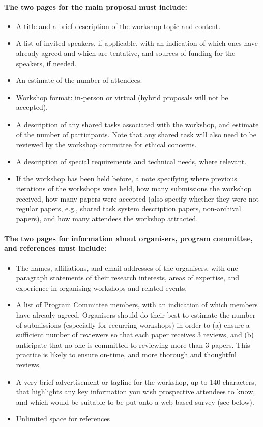 \documentclass[11pt]{article}
\begin{document}
\paragraph{The two pages for the main proposal must include:}
\begin{itemize}
    \item A title and a brief description of the workshop topic and content.
    \item A list of invited speakers, if applicable, with an indication of which ones have already agreed and which are tentative, and sources of funding for the speakers, if needed.
    \item An estimate of the number of attendees.
    \item Workshop format: in-person or virtual (hybrid proposals will not be accepted).
    \item A description of any shared tasks associated with the workshop, and estimate of the number of participants. Note that any shared task will also need to be reviewed by the workshop committee for ethical concerns.
    \item A description of special requirements and technical needs, where relevant.
    \item If the workshop has been held before, a note specifying where previous iterations of the workshops were held, how many submissions the workshop received, how many papers were accepted (also specify whether they were not regular papers, e.g., shared task system description papers, non-archival papers), and how many attendees the workshop attracted.

\end{itemize}

\paragraph{The two pages for information about organisers, program committee, and references must include:}
\begin{itemize}
    \item The names, affiliations, and email addresses of the organisers, with one-paragraph statements of their research interests, areas of expertise, and experience in organising workshops and related events.
    \item A list of Program Committee members, with an indication of which members have already agreed. Organisers should do their best to estimate the number of submissions (especially for recurring workshops) in order to (a) ensure a sufficient number of reviewers so that each paper receives 3 reviews, and (b) anticipate that no one is committed to reviewing more than 3 papers. This practice is likely to ensure on-time, and more thorough and thoughtful reviews.
    \item A very brief advertisement or tagline for the workshop, up to 140 characters, that highlights any key information you wish prospective attendees to know, and which would be suitable to be put onto a web-based survey (see below).
    \item Unlimited space for references

\end{itemize}
\end{document}
